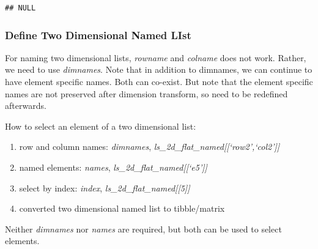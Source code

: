 \documentclass[
]{book}
\providecommand{\tightlist}{%
  \setlength{\itemsep}{0pt}\setlength{\parskip}{0pt}}
\begin{document}
\begin{verbatim}
## NULL
\end{verbatim}

\hypertarget{define-two-dimensional-named-list}{%
\subsubsection{Define Two Dimensional Named LIst}\label{define-two-dimensional-named-list}}

For naming two dimensional lists, \emph{rowname} and \emph{colname} does not work. Rather, we need to use \emph{dimnames}. Note that in addition to dimnames, we can continue to have element specific names. Both can co-exist. But note that the element specific names are not preserved after dimension transform, so need to be redefined afterwards.

How to select an element of a two dimensional list:

\begin{enumerate}
\def\labelenumi{\arabic{enumi}.}
\tightlist
\item
  row and column names: \emph{dimnames}, \emph{ls\_2d\_flat\_named{[}{[}`row2',`col2'{]}{]}}
\item
  named elements: \emph{names}, \emph{ls\_2d\_flat\_named{[}{[}`e5'{]}{]}}
\item
  select by index: \emph{index}, \emph{ls\_2d\_flat\_named{[}{[}5{]}{]}}
\item
  converted two dimensional named list to tibble/matrix
\end{enumerate}

Neither \emph{dimnames} nor \emph{names} are required, but both can be used to select elements.
\end{document}
